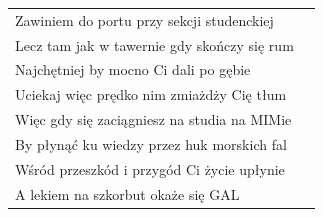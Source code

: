 \documentclass[11pt]{mwrep}
\renewcommand{\[}{\begin{equation}}
\renewcommand{\]}{\end{equation}}
\begin{document}
{\begin{tabular}{ll}
Zawiniem do portu przy sekcji studenckiej \\ 
Lecz tam jak w tawernie gdy skończy się rum \\ 
Najchętniej by mocno Ci dali po gębie \\ 
Uciekaj więc prędko nim zmiażdży Cię tłum \vspace{0.8eM}\\ 

Więc gdy się zaciągniesz na studia na MIMie \\ 
By płynąć ku wiedzy przez huk morskich fal \\ 
Wśród przeszkód i przygód Ci życie upłynie \\ 
A lekiem na szkorbut okaże się GAL \\ 
\end{tabular}}
\printindex
\end{document}
